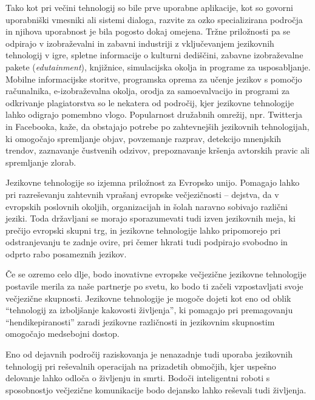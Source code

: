 \begin{multicols}{2}
Tako kot pri večini tehnologij so bile prve uporabne aplikacije, kot so go\-vorni uporabniški vmesniki ali sistemi dialoga, razvite za ozko specializirana področja in njihova uporabnost je bila pogosto dokaj omejena. Tržne priložnosti pa se odpirajo v izobraževalni in zabavni industriji z vključevanjem jezikovnih tehnologij v igre, spletne informacije o kulturni dediščini, zabavne izobraževalne pakete (\textit{edutainment}), knjižnice, simulacij\-ska okolja in programe za usposab\-ljanje. Mobilne informacij\-ske storitve, programska oprema za učenje jezikov s pomočjo računalnika, e-izobraževalna okolja, orodja za samoevalvacijo in programi za odkrivanje plagiatorstva so le nekatera od področij, kjer jezikovne tehnologije lahko odigrajo pomembno vlogo. Popularnost družabnih omrežij, npr. Twitterja in Facebooka, kaže, da obstajajo potrebe po zah\-tevnej\-ših jezikovnih tehnologijah, ki omogočajo sprem\-ljanje objav, povzemanje razprav, detekcijo mnenj\-skih trendov, zaznavanje čustvenih odzivov, prepoznavanje kršenja avtorskih pravic ali spremljanje zlorab. 

Jezikovne tehnologije so izjemna priložnost za Evropsko unijo. Pomagajo lahko pri razreševanju zah\-tevnih vprašanj evropske večjezičnosti – dejstva, da v evropskih poslovnih okoljih, organizacijah in šolah naravno sobivajo različni jeziki. Toda držav\-ljani se morajo sporazumevati tudi izven jezikovnih meja, ki prečijo evropski skupni trg, in jezikovne tehnologije lahko pripomorejo pri odstranjevanju te zadnje ovire, pri čemer hkrati tudi podpirajo svobodno in odprto rabo posameznih jezikov. 


Če se ozremo celo dlje, bodo inovativne evropske večjezične jezikovne tehnologije postavile merila za naše partnerje po svetu, ko bodo ti začeli vzpostav\-ljati svoje večjezične skupnosti. Jezikovne tehnologije je mogoče dojeti kot eno od oblik “tehnologij za izboljšanje kakovosti živ\-ljenja”, ki pomagajo pri premagovanju “hendikepiranosti” zaradi jezikovne različnosti in jezikovnim skupnostim omogočajo medsebojni dostop.

Eno od dejavnih področij raziskovanja je nenazadnje tudi uporaba jezikovnih tehnologij pri reševalnih operacijah na prizadetih območjih, kjer uspešno delovanje lahko odloča o živ\-ljenju in smrti. Bodoči inteligentni roboti s sposobnostjo večjezične komunikacije bodo dejansko lahko reševali tudi živ\-ljenja.


\end{multicols}
